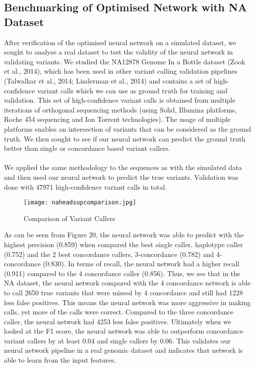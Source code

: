 \documentclass{article}
\begin{document}
\subsection{Benchmarking of Optimised Network with NA Dataset}
After verification of the optimised neural network on a simulated dataset, we sought to analyse a real dataset to test the validity of the neural network in validating variants. We studied the NA12878 Genome In a Bottle dataset (Zook et al., 2014), which has been used in other variant calling validation pipelines (Talwalkar et al., 2014; Linderman et al., 2014) and contains a set of high-confidence variant calls which we can use as ground truth for training and validation. This set of high-confidence variant calls is obtained from multiple iterations of orthogonal sequencing methods (using Solid, Illumina platforms, Roche 454 sequencing and Ion Torrent technologies). The usage of multiple platforms enables an intersection of variants that can be considered as the ground truth. We then sought to see if our neural network can predict the ground truth better than single or concordance based variant callers. \\\\We applied the same methodology to the sequences as with the simulated data and then used our neural network to predict the true variants. Validation was done with 47971 high-confidence variant calls in total.
\begin{figure}[H]
\texttt{[image: naheadsupcomparison.jpg]}
\caption{Comparison of Variant Callers}
\centering
\end{figure}
As can be seen from Figure 20, the neural network was able to predict with the highest precision (0.859) when compared the best single caller, haplotype caller (0.752) and the 2 best concordance callers, 3-concordance (0.782) and 4-concordance (0.830). In terms of recall, the neural network had a higher recall (0.911) compared to the 4 concordance caller (0.856). Thus, we see that in the NA dataset, the neural network compared with the 4 concordance network is able to call 2650 true variants that were missed by 4 concordance and still had 1228 less false positives. This means the neural network was more aggressive in making calls, yet more of the calls were correct. Compared to the three concordance caller, the neural network had 4253 less false positives. Ultimately when we looked at the F1 score, the neural network was able to outperform concordance variant callers by at least 0.04 and single callers by 0.06. This validates our neural network pipeline in a real genomic dataset and indicates that network is able to learn from the input features.
\newpage
\end{document}
